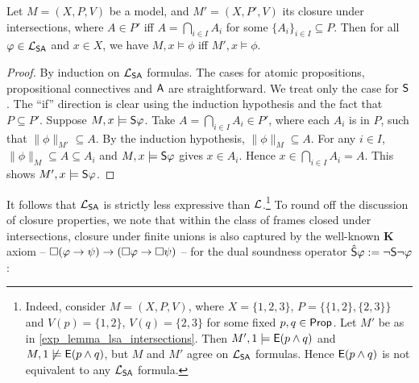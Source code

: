 \begin{lemma}
\label{exp_lemma_lsa_intersections}

    Let $M = (X, P, V)$ be a model, and $M' = (X, P', V)$ its closure under
    intersections, where $A \in P'$ iff $A = \bigcap_{i \in I}{A_i}$ for some
    $\{A_i\}_{i \in I} \subseteq P$. Then for all $\phi \in \cLSA$ and $x \in
    X$, we have $M, x \models \phi$ iff $M', x \models \phi$.

\end{lemma}

\begin{proof}

    By induction on $\cLSA$ formulas. The cases for atomic
    propositions, propositional connectives and $\A$ are straightforward. We
    treat only the case for $\S$.
    The ``if'' direction is clear using
    the induction hypothesis and the fact that $P \subseteq P'$. Suppose $M, x
    \models \S\phi$. Take $A = \bigcap_{i \in I}{A_i} \in P'$, where each $A_i$
    is in $P$, such that $\|\phi\|_{M'} \subseteq A$. By the induction
    hypothesis, $\|\phi\|_M \subseteq A$. For any $i \in I$, $\|\phi\|_M
    \subseteq A \subseteq A_i$ and $M, x \models \S\phi$ gives $x \in A_i$.
    Hence $x \in \bigcap_{i \in I}{A_i} = A$. This shows $M', x \models
    \S\phi$.
\end{proof}

It follows that $\cLSA$ is strictly less expressive than $\cL$.\footnote{
    Indeed, consider $M = (X, P, V)$, where $X = \{1, 2, 3\}$, $P = \{\{1, 2\}, \{2,
    3\}\}$ and $V(p) = \{1, 2\}$, $V(q) = \{2, 3\}$ for some fixed $p, q \in
    \Prop$. Let $M'$ be as in \cref{exp_lemma_lsa_intersections}. Then $M', 1
    \models \E(p \land q)$ and $M, 1 \not\models \E(p \land q)$, but $M$ and
    $M'$ agree on $\cLSA$ formulas. Hence $\E(p \land q)$ is not equivalent to
    any $\cLSA$ formula.
}
%
To round off the discussion of closure properties, we note that within the
class of frames closed under intersections, closure under finite unions is also
captured by the well-known \textbf{K} axiom -- $\Box(\phi \limplies \psi)
\limplies (\Box\phi \limplies \Box\psi)$ -- for the dual soundness operator
$\hat{\S}\phi := \neg\S\neg\phi$:

